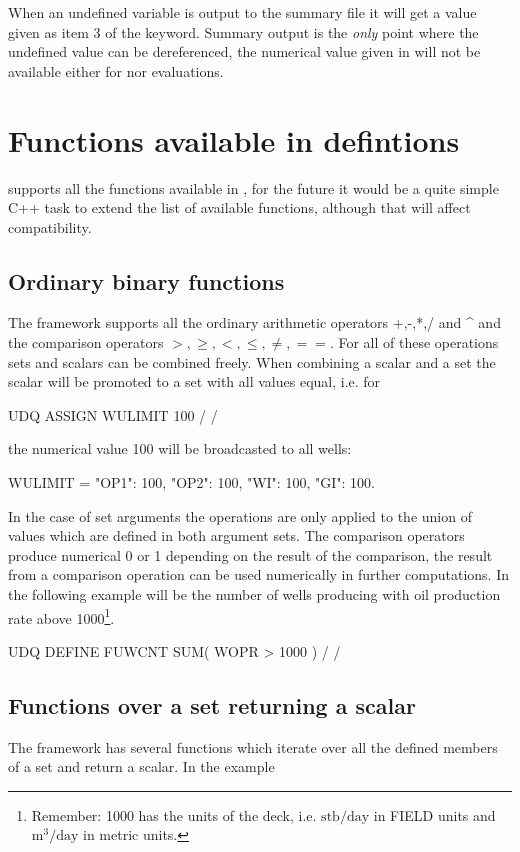 When an undefined variable is output to the summary file it will get a value
given as item 3 of the  keyword. Summary output is the \emph{only}
point where the undefined value can be dereferenced, the numerical value given
in  will not be available either for \udq{} nor 
evaluations.


\section{Functions available in \udq{} defintions}
\label{udq_functions}
\flow{} supports all the \udq{} functions available in \eclipse{}, for the
future it would be a quite simple C++ task to extend the list of available
functions, although that will affect \eclipse{} compatibility.

\subsection{Ordinary binary functions}
The \udq{} framework supports all the ordinary arithmetic operators +,-,*,/ and
\^{} and the comparison operators $>, \ge, <, \le, \ne, ==$. For all of these
operations sets and scalars can be combined freely. When combining a scalar and
a set the scalar will be promoted to a set with all values equal, i.e. for
\begin{deck}
UDQ
  ASSIGN WULIMIT 100 /
/
\end{deck}
the numerical value 100 will be broadcasted to all wells:
\begin{code}
  WULIMIT = {"OP1": 100, "OP2": 100, "WI": 100,  "GI": 100}.
\end{code}

In the case of set arguments the operations are only applied to the union of
values which are defined in both argument sets. The comparison operators produce
numerical 0 or 1 depending on the result of the comparison, the result from a
comparison operation can be used numerically in further computations. In the
following example  will be the number of wells producing with oil
production rate above 1000\footnote{Remember: 1000 has the units of the
deck, i.e. $\mathrm{stb/day}$ in FIELD units and $\mathrm{m^3/day}$ in metric
units.}.
\begin{deck}
UDQ
  DEFINE FUWCNT SUM( WOPR > 1000 ) /
/
\end{deck}



\subsection{Functions over a set returning a scalar}
The \udq{} framework has several functions which iterate over all the defined
members of a set and return a scalar. In the example

